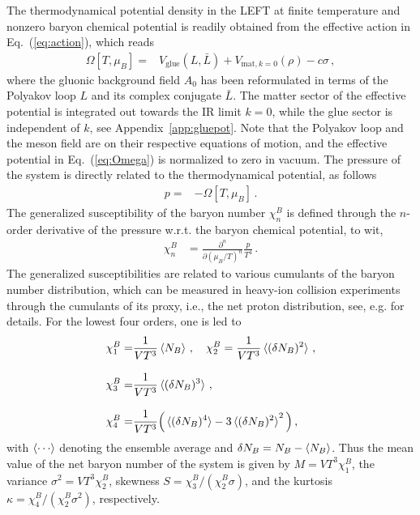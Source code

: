 \documentclass[%
reprint,
superscriptaddress,
showpacs,preprintnumbers,
 amsmath,amssymb,
 aps,
prd,
]{revtex4-1}
\def\Eq#1{Eq.~(\ref{#1})}
\def\app#1{Appendix~\ref{#1}}
\begin{document}
The thermodynamical potential density in the LEFT at finite temperature and nonzero baryon chemical potential is readily obtained from the effective action in \Eq{eq:action}, which reads
%
\begin{align}
  \Omega[T,\mu_B]=&V_{\mathrm{glue}}(L, \bar L)+V_{\mathrm{mat},k=0}(\rho)-c\sigma\,,\label{eq:Omega}
\end{align}
%
where the gluonic background field $A_0$ has been reformulated in terms of the Polyakov loop $L$ and its complex conjugate $\bar L$. The matter sector of the effective potential is integrated out towards the IR limit $k=0$, while the glue sector is independent of $k$, see \app{app:gluepot}. Note that the Polyakov loop and the meson field are on their respective equations of motion, and the effective potential in \Eq{eq:Omega} is normalized to zero in vacuum. The pressure of the system is directly related to the thermodynamical potential, as follows
%
\begin{align}
  p=&-\Omega[T,\mu_B]\,.\label{eq:pres}
\end{align}
%
The generalized susceptibility of the baryon number $\chi^B_n$ is defined through the $n$-order derivative of the pressure w.r.t. the baryon chemical potential, to wit,
%
\begin{align}
  \chi_n^{B}&=\frac{\partial^n}{\partial (\mu_B/T)^n}\frac{p}{T^4}\,.\label{eq:suscept}
\end{align}
%
The generalized susceptibilities are related to various cumulants of the baryon number distribution, which can be measured in heavy-ion collision experiments through the cumulants of its proxy, i.e., the net proton distribution, see, e.g. \cite{Luo:2017faz} for details. For the lowest four orders, one is led to
%
\begin{align}
\chi^B_1=&\frac{1}{VT^3}\braket{N_B}\,,\quad \chi^B_2=\frac{1}{VT^3}\braket{(\delta N_B)^2}\,,\label{eq:chiB1}\\[2ex]
\chi^B_3=&\frac{1}{VT^3}\braket{(\delta N_B)^3}\,,\\[2ex]
\chi^B_4=&\frac{1}{VT^3}\Big(\braket{(\delta N_B)^4}-3\braket{(\delta N_B)^2}^2\Big)\,,\label{eq:chiB4}
\end{align}
%
with $\braket{\cdots}$ denoting the ensemble average and $\delta N_B=N_B-\braket{N_B}$. Thus the mean value of the net baryon number of the system is given by $M=VT^3\chi_1^{B}$, the variance $\sigma^2=VT^3\chi_2^{B}$, skewness $S=\chi_3^{B}/(\chi_2^{B}\sigma)$, and the kurtosis $\kappa=\chi_4^{B}/(\chi_2^{B}\sigma^2)$, respectively.
\end{document}

